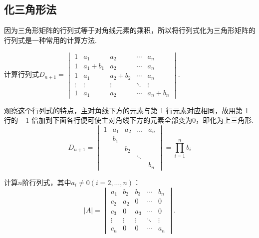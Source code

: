 \subsection{化三角形法}

因为三角形矩阵的行列式等于对角线元素的乘积，所以将行列式化为三角形矩阵的行列式是一种常用的计算方法.

\begin{example}{}{}
    计算行列式$D_{n+1}=\begin{vmatrix}
            1      & a_{1}       & a_{2}       & \cdots & a_n       \\
            1      & a_{1}+b_{1} & a_{2}       & \cdots & a_n       \\
            1      & a_{1}       & a_{2}+b_{2} & \cdots & a_n       \\
            \vdots & \vdots      & \vdots      & \ddots & \vdots    \\
            1      & a_{1}       & a_{2}       & \cdots & a_n+b_{n}
        \end{vmatrix}$.
\end{example}


\begin{solution}
    观察这个行列式的特点，主对角线下方的元素与第 1 行元素对应相同，故用第 1 行的 $-1$ 倍加到下面各行便可使主对角线下方的元素全部变为0，即化为上三角形.
    \[ D_{n+1}=\begin{vmatrix}
            1 & a_{1} & a_{2} & \ldots & a_n   \\
              & b_{1} &       &        &       \\
              &       & b_{2} &        &       \\
              &       &       & \ddots &       \\
              &       &       &        & b_{n}
        \end{vmatrix}=\prod_{i=1}^n b_i \]
\end{solution}

\begin{example}{}{}
    计算$n$阶行列式，其中$a_i\neq 0(i=2,\ldots,n)$：
    \[|A|=\begin{vmatrix}
        a_1 & b_2 & b_3 & \cdots & b_n \\
        c_2 & a_2 & 0 & \cdots & 0 \\
        c_3 & 0 & a_3 & \cdots & 0 \\
        \vdots & \vdots & \vdots & \ddots & \vdots \\
        c_n & 0 & 0 & \cdots & a_n
    \end{vmatrix}.\]
\end{example}

